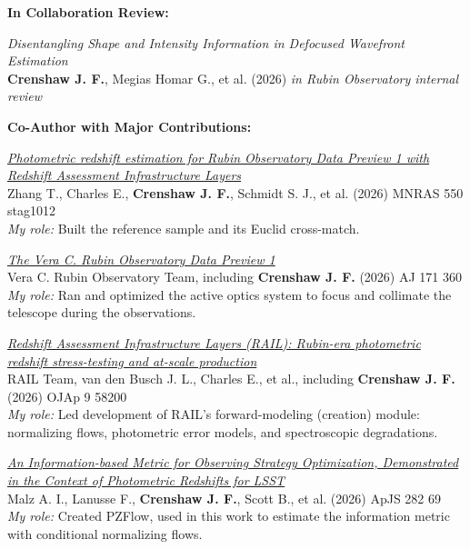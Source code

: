 \textbf{In Collaboration Review:}

\begin{etaremune}
\item \textit{Disentangling Shape and Intensity Information in Defocused Wavefront Estimation} \\
\textbf{Crenshaw J. F.}, Megias Homar G., et al. (2026)
\textit{in Rubin Observatory internal review}

\end{etaremune}

\textbf{Co-Author with Major Contributions:}

\begin{etaremune}
\item \href{https://ui.adsabs.harvard.edu/abs/2026MNRAS.550g1012Z}{\textit{Photometric redshift estimation for Rubin Observatory Data Preview 1 with Redshift Assessment Infrastructure Layers}} \\
Zhang T., Charles E., \textbf{Crenshaw J. F.}, Schmidt S. J., et al. (2026)
MNRAS 550 stag1012 \\
{\small \textit{My role:} Built the reference sample and its Euclid cross-match.}

\item \href{https://ui.adsabs.harvard.edu/abs/2026AJ....171..360V}{\textit{The Vera C. Rubin Observatory Data Preview 1}} \\
Vera C. Rubin Observatory Team, including \textbf{Crenshaw J. F.} (2026)
AJ 171 360 \\
{\small \textit{My role:} Ran and optimized the active optics system to focus and collimate the telescope during the observations.}

\item \href{https://ui.adsabs.harvard.edu/abs/2026OJAp....958200R}{\textit{Redshift Assessment Infrastructure Layers (RAIL): Rubin-era photometric redshift stress-testing and at-scale production}} \\
RAIL Team, van den Busch J. L., Charles E., et al., including \textbf{Crenshaw J. F.} (2026)
OJAp 9 58200 \\
{\small \textit{My role:} Led development of RAIL's forward-modeling (creation) module: normalizing flows, photometric error models, and spectroscopic degradations.}

\item \href{https://ui.adsabs.harvard.edu/abs/2026ApJS..282...69M}{\textit{An Information-based Metric for Observing Strategy Optimization, Demonstrated in the Context of Photometric Redshifts for LSST}} \\
Malz A. I., Lanusse F., \textbf{Crenshaw J. F.}, Scott B., et al. (2026)
ApJS 282 69 \\
{\small \textit{My role:} Created PZFlow, used in this work to estimate the information metric with conditional normalizing flows.}


\end{etaremune}
